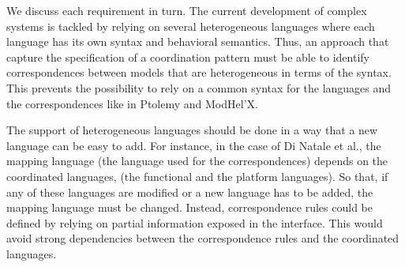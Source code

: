 {We discuss each requirement in turn. The current development of complex systems is tackled by relying on several heterogeneous languages where each language has its own syntax and behavioral semantics. Thus, an approach that capture the specification of a coordination pattern must be able to identify correspondences between models that are heterogeneous in terms of the syntax. This prevents the possibility to rely on a common syntax for the languages and the correspondences like in Ptolemy and ModHel'X.


The support of heterogeneous languages should be done in a way that a new language can be easy to add. For instance, in the case of Di Natale et al., the mapping language (\ie the language used for the correspondences) depends on the coordinated languages, (\ie the functional and the platform languages). So that, if any of these languages are modified or a new language has to be added, the mapping language must be changed. Instead, correspondence rules could be defined by relying on partial information exposed in the interface. This would avoid strong dependencies between the correspondence rules and the coordinated languages.






}
